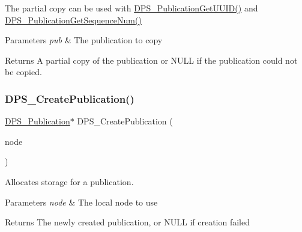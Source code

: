 The partial copy can be used with \hyperlink{group__publication_gaba1ad3ee807b75a1281d334be06a12f7}{D\+P\+S\+\_\+\+Publication\+Get\+U\+U\+I\+D()} and \hyperlink{group__publication_ga875b48217d861d4a9fa5471419d354e9}{D\+P\+S\+\_\+\+Publication\+Get\+Sequence\+Num()}


\begin{DoxyParams}{Parameters}
{\em pub} & The publication to copy\\
\hline
\end{DoxyParams}
\begin{DoxyReturn}{Returns}
A partial copy of the publication or N\+U\+LL if the publication could not be copied. 
\end{DoxyReturn}
\mbox{\label{group__publication_gaca070a96a6374e99a05d647c10737962}} 
\subsubsection{\texorpdfstring{D\+P\+S\+\_\+\+Create\+Publication()}{DPS\_CreatePublication()}}
{\footnotesize\ttfamily \hyperlink{group__publication_ga0d439693474aa54e27f3d45a054696ac}{D\+P\+S\+\_\+\+Publication}$\ast$ D\+P\+S\+\_\+\+Create\+Publication (\begin{DoxyParamCaption}\item[{\hyperlink{group__node_ga4dd612ab965134321bb57fdb065f121c}{D\+P\+S\+\_\+\+Node} $\ast$}]{node }\end{DoxyParamCaption})}



Allocates storage for a publication. 


\begin{DoxyParams}{Parameters}
{\em node} & The local node to use\\
\hline
\end{DoxyParams}
\begin{DoxyReturn}{Returns}
The newly created publication, or N\+U\+LL if creation failed 
\end{DoxyReturn}
\mbox{\label{group__publication_ga17bb01c949aaaf3bafd53323c9effd5f}} 
